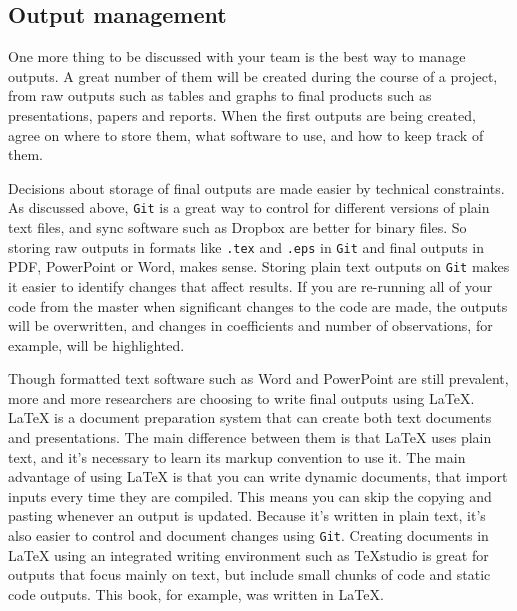 \subsection{Output management}

One more thing to be discussed with your team is the best way to manage outputs. 
A great number of them will be created during the course of a project, 
from raw outputs such as tables and graphs to final products such as presentations, papers and reports.
When the first outputs are being created, agree on where to store them,
what software to use, and how to keep track of them.

Decisions about storage of final outputs are made easier by technical constraints. 
As discussed above, \texttt{Git} is a great way to control for different versions of 
plain text files, and sync software such as Dropbox are better for binary files.
So storing raw outputs in formats like \texttt{.tex} and \texttt{.eps} in \texttt{Git} and 
final outputs in PDF, PowerPoint or Word, makes sense.
Storing plain text outputs on \texttt{Git} makes it easier to identify changes that affect results.
If you are re-running all of your code from the master when significant changes to the code are made,
the outputs will be overwritten, and changes in coefficients and number of observations, for example, 
will be highlighted.

Though formatted text software such as Word and PowerPoint are still prevalent, 
more and more researchers are choosing to write final outputs using  
\LaTeX{}.
{\LaTeX} is a document preparation system that can create both text documents and presentations.
The main difference between them is that {\LaTeX} uses plain text, 
and it's necessary to learn its markup convention to use it. 
The main advantage of using {\LaTeX} is that you can write dynamic documents, 
that import inputs every time they are compiled. 
This means you can skip the copying and pasting whenever an output is updated. 
Because it's written in plain text, it's also easier to control and document changes using \texttt{Git}. 
Creating documents in {\LaTeX} using an integrated writing environment such as TeXstudio 
is great for outputs that focus mainly on text,
but include small chunks of code and static code outputs.
This book, for example, was written in \LaTeX.

